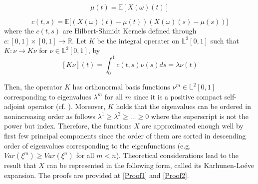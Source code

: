 \documentclass[11pt,twoside,a4paper]{article}
\begin{document}
	
	
	
	\begin{equation}\label{MeanFunction}
		\mu(t) = \mathbb{E}\left[ X(\omega)(t) \right]
	\end{equation}
	
	\begin{equation}\label{CovarianceFunction}
		c(t,s) = \mathbb{E}\big[ \left( X(\omega)(t) - \mu(t) \right) \left( X(\omega)(s) - \mu(s) \right) \big]
	\end{equation}
	where the $c(t,s)$ are Hilbert-Shmidt Kernels defined through $c : [0,1] \times [0,1] \rightarrow \mathbb{R}$. Let $K$ be the integral operater on $\mathbb{L}^{2}[0,1]$ such that $K : \nu \rightarrow K \nu$ for $\nu \in \mathbb{L}^{2}[0,1]$, by
	\begin{equation}\label{HSKernal}
		[K \nu](t) = \int_{0}^{1}c(t,s) \nu(s)ds = \lambda \nu(t)
	\end{equation}
	
	Then, the operator $K$ has orthonormal basis functions $\nu^{m} \in \mathbb{L}^{2}[0,1]$ corresponding to eigenvalues $\lambda^{m}$ for all $m$ since it is a positive compact self-adjoint operator (cf. \cite{alexanderian_KLexpansion_2015}). Moreover, $K$ holds that the eigenvalues can be ordered in nonincreasing order as follows $\lambda^{1} \geq \lambda^{2} \geq \dots \geq 0$ where the superscript is not the power but index. Therefore, the functions $X$ are approximated enough well by first few principal components since the order of them are sorted in descending order of eigenvalues corresponding to the eigenfunctions (e.g. $Var(\xi^{m}) \geq Var(\xi^{n})$ for all $m < n$). Theoretical considerations lead to the result that $X$ can be represented in the following form, called its Karhunen-Lo\'{e}ve expansion. The proofs are provided at \ref{Proof1} and \ref{Proof2}.
	
\end{document}
